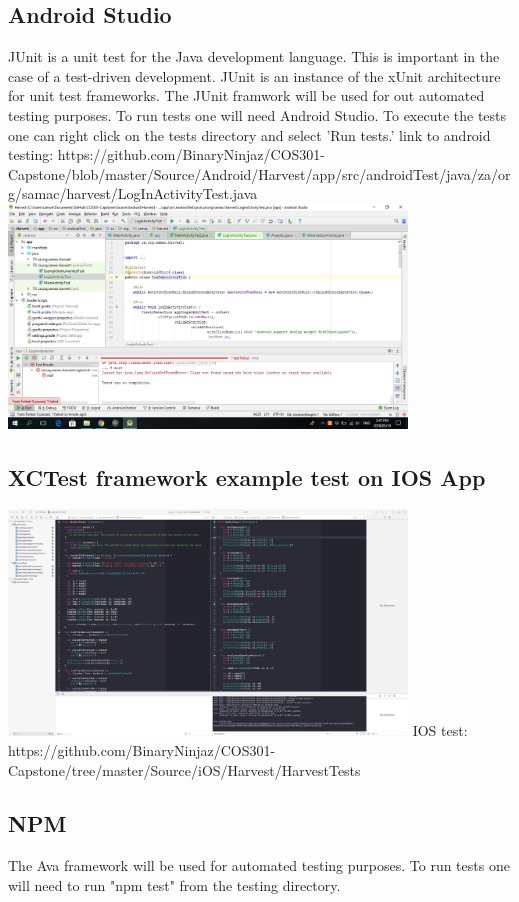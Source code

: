 \documentclass[12pt]{article}
\begin{document}
  \subsection{Android Studio}
JUnit is a unit test for the Java development language. This is important in the case of a test-driven development. JUnit is an instance of the xUnit architecture for unit test frameworks. The JUnit framwork will be used for out automated testing purposes. To run tests one will need Android Studio. To execute the tests one can right click on the tests directory and select 'Run tests.'\newline
link to android testing: https://github.com/BinaryNinjaz/COS301-Capstone/blob/master/Source/Android/Harvest/app/src/androidTest/java/za/org/samac/harvest/LogInActivityTest.java \newline
\includegraphics[width=400px]{images/FailedLoginTest}
\subsection{ XCTest framework example test on IOS App}
\includegraphics[width=400px]{images/iostest}
IOS test:  https://github.com/BinaryNinjaz/COS301-Capstone/tree/master/Source/iOS/Harvest/HarvestTests \newline

  \subsection{NPM}
  The Ava framework will be used for automated testing purposes. To run tests one will need to run "npm test" from the testing directory.
\end{document}
